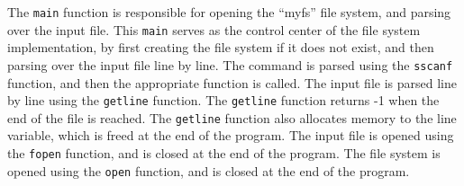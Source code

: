 \documentclass{article}
\theoremstyle{mytheoremstyle}
\theoremstyle{mytheoremstyle}
\theoremstyle{myproblemstyle}
\begin{document}
The \texttt{main} function is responsible for opening the ``myfs'' file system, and parsing over the input file. This \texttt{main} serves as the control center of the file system implementation, by first creating the file system if it does not exist, and then parsing over the input file line by line. The command is parsed using the \texttt{sscanf} function, and then the appropriate function is called. The input file is parsed line by line using the \texttt{getline} function. The \texttt{getline} function returns -1 when the end of the file is reached. The \texttt{getline} function also allocates memory to the line variable, which is freed at the end of the program. The input file is opened using the \texttt{fopen} function, and is closed at the end of the program. The file system is opened using the \texttt{open} function, and is closed at the end of the program.



\end{document}
